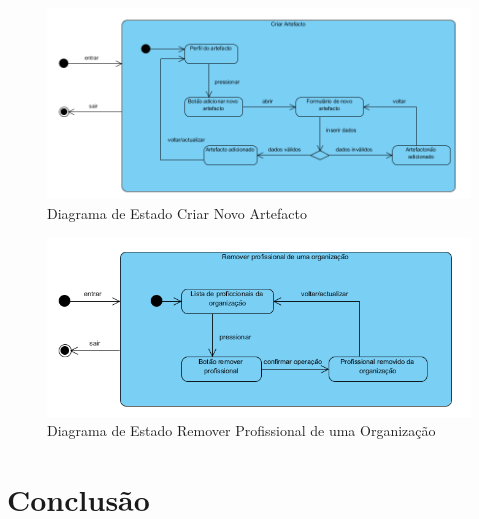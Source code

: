 ﻿\documentclass[12pt,a4paper]{article}
\begin{document}
\begin{figure}[h!]
\centering
\includegraphics[scale=0.7]{estado/criarartefacto}
\caption{Diagrama de Estado Criar Novo Artefacto} 
\end{figure} 
  
\begin{figure}[h!]
\centering
\includegraphics[scale=0.8]{estado/removerprofissional}
\caption{Diagrama de Estado Remover Profissional de uma Organização} 
\end{figure}   
  
 
\clearpage
\section{Conclusão} 
 
\end{document}

